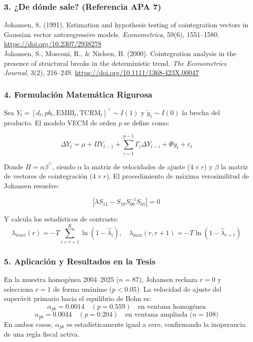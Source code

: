\documentclass[11pt,a4paper]{article}
\begin{document}
\subsubsection{3. ¿De dónde sale? (Referencia APA 7)}
\begin{mdframed}[style=apabox]
Johansen, S. (1991). Estimation and hypothesis testing of cointegration vectors in Gaussian vector autoregressive models. \textit{Econometrica}, 59(6), 1551--1580. \url{https://doi.org/10.2307/2938278}\\
Johansen, S., Mosconi, R., \& Nielsen, B. (2000). Cointegration analysis in the presence of structural breaks in the deterministic trend. \textit{The Econometrics Journal}, 3(2), 216--249. \url{https://doi.org/10.1111/1368-423X.00047}
\end{mdframed}

\subsubsection{4. Formulación Matemática Rigurosa}
Sea $Y_t = [d_t, pb_t, \text{EMBI}_t, \text{TCRM}_t]^\top \sim I(1)$ y $\tilde{y}_t \sim I(0)$ la brecha del producto. El modelo VECM de orden $p$ se define como:

\begin{equation}
\Delta Y_t = \mu + \Pi Y_{t-1} + \sum_{i=1}^{p-1} \Gamma_i \Delta Y_{t-i} + \Phi \tilde{y}_t + \varepsilon_t
\end{equation}

Donde $\Pi = \alpha \beta^\top$, siendo $\alpha$ la matriz de velocidades de ajuste ($4 \times r$) y $\beta$ la matriz de vectores de cointegración ($4 \times r$).
El procedimiento de máxima verosimilitud de Johansen resuelve:

\begin{equation}
|\lambda S_{11} - S_{10} S_{00}^{-1} S_{01}| = 0
\end{equation}

Y calcula los estadísticos de contraste:
\begin{equation}
\lambda_{\text{trace}}(r) = -T \sum_{i=r+1}^{K} \ln(1 - \hat{\lambda}_i), \quad \lambda_{\max}(r, r+1) = -T \ln(1 - \hat{\lambda}_{r+1})
\end{equation}

\subsubsection{5. Aplicación y Resultados en la Tesis}
En la muestra homogénea 2004--2025 ($n=87$), Johansen rechaza $r=0$ y selecciona $r=1$ de forma unánime ($p < 0.05$). La velocidad de ajuste del superávit primario hacia el equilibrio de Bohn es:
\begin{equation}
\alpha_{pb} = 0.0014 \quad (p = 0.559) \quad \text{en ventana homogénea}
\end{equation}
\begin{equation}
\alpha_{pb} = 0.0044 \quad (p = 0.204) \quad \text{en ventana ampliada ($n=108$)}
\end{equation}
En ambos casos, $\alpha_{pb}$ es estadísticamente igual a cero, confirmando la inoperancia de una regla fiscal activa.
\end{document}
